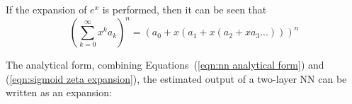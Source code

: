If the expansion of $e^x$ is performed, then it can be seen that
\begin{equation}
	(\sum_{k=0}^\infty x^k a_k)^n = (a_0+x(a_1+x(a_2+xa_3...)))^n
\end{equation}

%
%
%
%
%
%


The analytical form, combining Equations~(\ref{eqn:nn analytical form}) and (\ref{eqn:sigmoid zeta expansion}), the estimated output of a two-layer NN can be written as an expansion:

